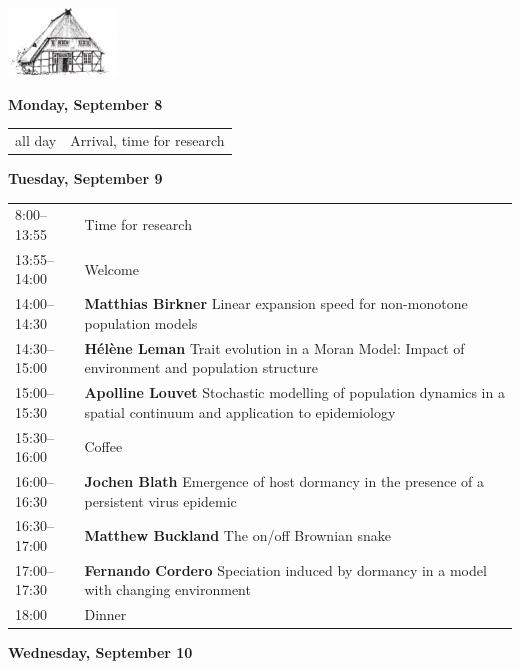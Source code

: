 \documentclass[12pt,a4paper]{article}
\newcommand{\Kopf}{%
\begin{center}%
\includegraphics[width=.2\textwidth]{logo-tsh}\\[2ex]
\end{center}
}
\begin{document}
\pagebreak 
\pagestyle{headings}
\renewcommand{\arraystretch}{1.85}

\Kopf
\vspace*{.75cm}

\textbf{\Large Monday, September 8}\medskip

\begin{tabular}{@{}l p{}@{}}
all day \phantom{xxxxx} & Arrival, time for research \\
\end{tabular}

\vspace{.5cm}
\textbf{\Large Tuesday, September 9}\medskip

\begin{tabular}{@{}l p{}@{}}
8:00--13:55 & Time for research \\
13:55--14:00 & Welcome \\
14:00--14:30 &\textbf{Matthias Birkner } Linear expansion speed for non-monotone population models \\
14:30--15:00 &\textbf{Hélène Leman } Trait evolution in a Moran Model: Impact of environment and population structure \\
15:00--15:30 &\textbf{Apolline Louvet } Stochastic modelling of population dynamics in a spatial continuum and application to epidemiology \\
15:30--16:00 & Coffee \\
16:00--16:30 &\textbf{Jochen Blath } Emergence of host dormancy in the presence of a persistent virus epidemic \\
16:30--17:00 &\textbf{Matthew Buckland } The on/off Brownian snake \\
17:00--17:30 &\textbf{Fernando Cordero } Speciation induced by dormancy in a model with changing environment \\
18:00 & Dinner \\
\end{tabular}

\newpage
\textbf{\Large Wednesday, September 10}\medskip
\end{document}
